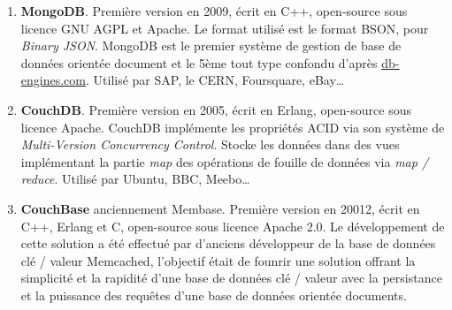   \begin{enumerate}
    \item \textbf{MongoDB}. Première version en 2009, écrit en C++, open-source sous licence GNU AGPL et Apache. Le format utilisé est le format BSON, pour \textit{Binary JSON}. MongoDB est le premier système de gestion de base de données orientée document et le 5ème tout type confondu d'après \url{db-engines.com}. Utilisé par SAP, le CERN, Foursquare, eBay\dots\cite{Wikipedia_mongodb}
    \item \textbf{CouchDB}. Première version en 2005, écrit en Erlang, open-source sous licence Apache. CouchDB implémente les propriétés ACID via son système de \textit{Multi-Version Concurrency Control}. Stocke les données dans des vues implémentant la partie \textit{map} des opérations de fouille de données via \textit{map / reduce}. Utilisé par Ubuntu, BBC, Meebo\dots\cite{Wikipedia_couchdb}
    \item \textbf{CouchBase} anciennement Membase. Première version en 20012, écrit en C++, Erlang et C, open-source sous licence Apache 2.0. Le développement de cette solution a été effectué par d'anciens développeur de la base de données clé / valeur Memcached, l'objectif était de founrir une solution offrant la simplicité et la rapidité d'une base de données clé / valeur avec la persistance et la puissance des requêtes d'une base de données orientée documents.\cite{Wikipedia_couchbase}
  \end{enumerate}
